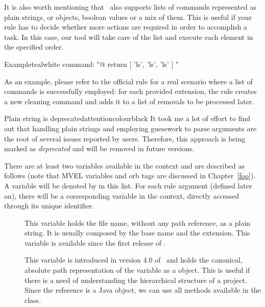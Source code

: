 \begin{description}
\begin{description}
It is also worth mentioning that \arara\ also supports lists of commands represented as plain strings,  or  objects, boolean values or a mix of them. This is useful if your rule has to decide whether more actions are required in order to accomplish a task. In this case, our tool will take care of the list and execute each element in the specified order.

\begin{codebox}{Example}{teal}{\icnote}{white}
command: "@{ return [ 'ls', 'ls', 'ls' ] }"
\end{codebox}

As an example, please refer to the official  rule for a real scenario where a list of commands is successfully employed: for each provided extension, the rule creates a new cleaning command and adds it to a list of removals to be processed later.

\begin{messagebox}{Plain string is deprecated}{attentioncolour}{\icattention}{black}
It took me a lot of effort to find out that handling plain strings and employing guesswork to parse arguments are the root of several issues reported by users. Therefore, this approach is being marked as \emph{deprecated} and will be removed in future versions.
\end{messagebox}

There are at least two variables available in the  context and are described as follows (note that MVEL variables and orb tags are discussed in Chapter~\ref{foo}). A variable will be denoted by  in this list. For each rule argument (defined later on), there will be a corresponding variable in the  context, directly accessed through its unique identifier.

\begin{description}
\item[] This variable holds the file name, without any path reference, as a plain string. It is usually composed by the base name and the extension. This variable is available since the first release of \arara.

\item[] This variable is introduced in version 4.0 of \arara\ and holds the canonical, absolute path representation of the  variable as a  object. This is useful if there is a need of understanding the hierarchical structure of a project. Since the reference is a Java object, we can use all methods available in the  class.
\end{description}


\end{description}
\end{description}
